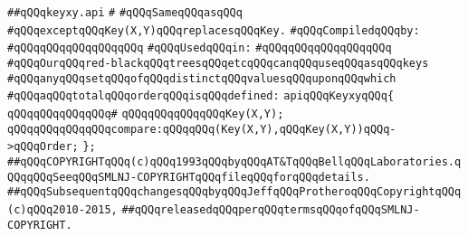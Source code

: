 \label{src/lib/src/keyxy.api}
\verb|##qQQqkeyxy.api|\newline
\verb|#|\newline
\verb|#qQQqSameqQQqasqQQq|\newline
\verb|#qQQqexceptqQQqKey(X,Y)qQQqreplacesqQQqKey.|\newline
\newline
\verb|#qQQqCompiledqQQqby:|\newline
\verb|#qQQqqQQqqQQqqQQqqQQq|\newline
\newline
\verb|#qQQqUsedqQQqin:|\newline
\verb|#qQQqqQQqqQQqqQQqqQQq|\newline
\newline
\newline
\newline
\verb|#qQQqOurqQQqred-blackqQQqtreesqQQqetcqQQqcanqQQquseqQQqasqQQqkeys|\newline
\verb|#qQQqanyqQQqsetqQQqofqQQqdistinctqQQqvaluesqQQquponqQQqwhich|\newline
\verb|#qQQqaqQQqtotalqQQqorderqQQqisqQQqdefined:|\newline
\newline
\newline
\verb|apiqQQqKeyxyqQQq{|\newline
\verb|qQQqqQQqqQQqqQQq#|\newline
\verb|qQQqqQQqqQQqqQQqKey(X,Y);|\newline
\verb|qQQqqQQqqQQqqQQqcompare:qQQqqQQq(Key(X,Y),qQQqKey(X,Y))qQQq->qQQqOrder;|\newline
\verb|};|\newline
\newline
\newline
\verb|##qQQqCOPYRIGHTqQQq(c)qQQq1993qQQqbyqQQqAT&TqQQqBellqQQqLaboratories.qQQqqQQqSeeqQQqSMLNJ-COPYRIGHTqQQqfileqQQqforqQQqdetails.|\newline
\verb|##qQQqSubsequentqQQqchangesqQQqbyqQQqJeffqQQqProtheroqQQqCopyrightqQQq(c)qQQq2010-2015,|\newline
\verb|##qQQqreleasedqQQqperqQQqtermsqQQqofqQQqSMLNJ-COPYRIGHT.|\newline

